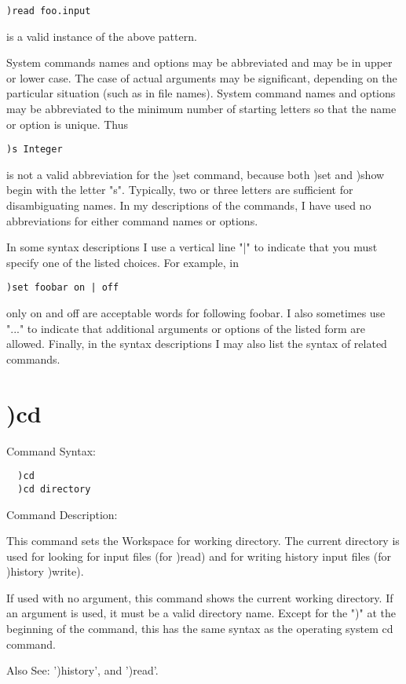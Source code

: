 \begin{verbatim}
)read foo.input
\end{verbatim}
is a valid instance of the above pattern.

System commands names and options may be abbreviated and may be in upper or lower case. The case of actual arguments may be significant, depending on the particular situation (such as in file names). System command names and options may be abbreviated to the minimum number of starting letters so that the name or option is unique. Thus

\begin{verbatim}
)s Integer
\end{verbatim}
is not a valid abbreviation for the )set command, because both )set and )show begin with the letter "s". Typically, two or three letters are sufficient for disambiguating names. In my descriptions of the commands, I have used no abbreviations for either command names or options.

In some syntax descriptions I use a vertical line "|" to indicate that you must specify one of the listed choices. For example, in

\begin{verbatim}
)set foobar on | off
\end{verbatim}
only on and off are acceptable words for following foobar. I also sometimes use "..." to indicate that additional arguments or options of the listed form are allowed. Finally, in the syntax descriptions I may also list the syntax of related commands.

\section{)cd}

Command Syntax:
\begin{verbatim}
  )cd
  )cd directory
\end{verbatim}
Command Description:

This command sets the Workspace for \nr{} working directory. The current directory is used for looking for input files (for )read) and for writing history input files (for )history )write).

If used with no argument, this command shows the current working directory. If an argument is used, it must be a valid directory name. Except for the ")" at the beginning of the command, this has the same syntax as the operating system cd command.

Also See: ')history', and ')read'.

